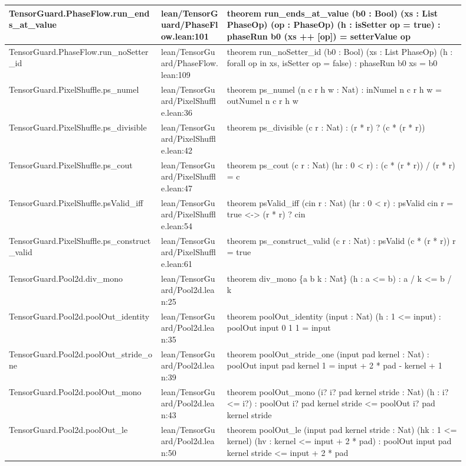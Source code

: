 \documentclass[10pt]{article}
\begin{document}
\begin{longtable}{|p{0.30\linewidth}|p{0.13\linewidth}|p{0.47\linewidth}|}
\hline
TensorGuard.PhaseFlow.run\_ends\_at\_value & lean/TensorGuard/PhaseFlow.lean:101 & theorem run\_ends\_at\_value (b0 : Bool) (xs : List PhaseOp) (op : PhaseOp) (h : isSetter op = true) : phaseRun b0 (xs ++ [op]) = setterValue op \\
\hline
TensorGuard.PhaseFlow.run\_noSetter\_id & lean/TensorGuard/PhaseFlow.lean:109 & theorem run\_noSetter\_id (b0 : Bool) (xs : List PhaseOp) (h : forall op in xs, isSetter op = false) : phaseRun b0 xs = b0 \\
\hline
TensorGuard.PixelShuffle.ps\_numel & lean/TensorGuard/PixelShuffle.lean:36 & theorem ps\_numel (n c r h w : Nat) : inNumel n c r h w = outNumel n c r h w \\
\hline
TensorGuard.PixelShuffle.ps\_divisible & lean/TensorGuard/PixelShuffle.lean:42 & theorem ps\_divisible (c r : Nat) : (r * r) ? (c * (r * r)) \\
\hline
TensorGuard.PixelShuffle.ps\_cout & lean/TensorGuard/PixelShuffle.lean:47 & theorem ps\_cout (c r : Nat) (hr : 0 < r) : (c * (r * r)) / (r * r) = c \\
\hline
TensorGuard.PixelShuffle.psValid\_iff & lean/TensorGuard/PixelShuffle.lean:54 & theorem psValid\_iff (cin r : Nat) (hr : 0 < r) : psValid cin r = true <-> (r * r) ? cin \\
\hline
TensorGuard.PixelShuffle.ps\_construct\_valid & lean/TensorGuard/PixelShuffle.lean:61 & theorem ps\_construct\_valid (c r : Nat) : psValid (c * (r * r)) r = true \\
\hline
TensorGuard.Pool2d.div\_mono & lean/TensorGuard/Pool2d.lean:25 & theorem div\_mono \{a b k : Nat\} (h : a <= b) : a / k <= b / k \\
\hline
TensorGuard.Pool2d.poolOut\_identity & lean/TensorGuard/Pool2d.lean:35 & theorem poolOut\_identity (input : Nat) (h : 1 <= input) : poolOut input 0 1 1 = input \\
\hline
TensorGuard.Pool2d.poolOut\_stride\_one & lean/TensorGuard/Pool2d.lean:39 & theorem poolOut\_stride\_one (input pad kernel : Nat) : poolOut input pad kernel 1 = input + 2 * pad - kernel + 1 \\
\hline
TensorGuard.Pool2d.poolOut\_mono & lean/TensorGuard/Pool2d.lean:43 & theorem poolOut\_mono (i? i? pad kernel stride : Nat) (h : i? <= i?) : poolOut i? pad kernel stride <= poolOut i? pad kernel stride \\
\hline
TensorGuard.Pool2d.poolOut\_le & lean/TensorGuard/Pool2d.lean:50 & theorem poolOut\_le (input pad kernel stride : Nat) (hk : 1 <= kernel) (hv : kernel <= input + 2 * pad) : poolOut input pad kernel stride <= input + 2 * pad \\

\end{longtable}
\end{document}
